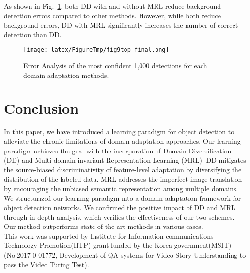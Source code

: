 \documentclass[10pt,twocolumn,letterpaper]{article}
\begin{document}
As shown in Fig.~\ref{fig:ErrAn}, both DD with and without MRL reduce background detection errors compared to other methods.
However, while both reduce background errors, DD with MRL significantly increases the number of correct detection than DD.










\begin{figure}[t]
\begin{center}
\texttt{[image: latex/FigureTmp/fig9top\_final.png]}

   
\end{center}
  \caption{Error Analysis of the most confident 1,000 detections for each domain adaptation methods.}
\label{fig:ErrAn}
\end{figure}


\section{Conclusion}
In this paper, we have introduced a learning paradigm for object detection to alleviate the chronic limitations of domain adaptation approaches.
Our learning paradigm achieves the goal with the incorporation of Domain Diversification (DD) and Multi-domain-invariant Representation Learning (MRL).
DD mitigates the source-biased discriminativity of feature-level adaptation by diversifying the distribution of the labeled data.
MRL addresses the imperfect image translation by encouraging the unbiased semantic representation among multiple domains.
We structurized our learning paradigm into a domain adaptation framework for object detection networks.
We confirmed the positive impact of DD and MRL through in-depth analysis, which verifies the effectiveness of our two schemes.
Our method outperforms state-of-the-art methods in various cases.\\

 This work was supported by Institute for Information  communications Technology Promotion(IITP) grant funded by the Korea government(MSIT) (No.2017-0-01772, Development of QA systems for Video Story Understanding to pass the Video Turing Test).

{\small


}
\end{document}
